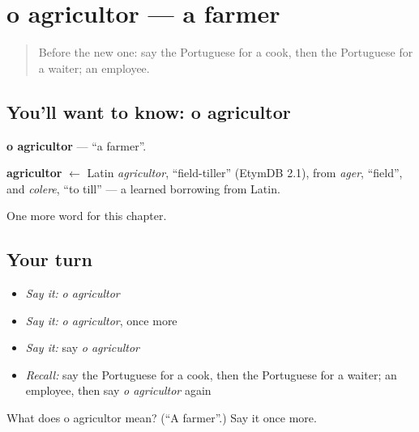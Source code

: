 \section[o agricultor]{o agricultor — a farmer}

\label{lesson:PT-C110-agricultor}



\begin{quote}
Before the new one: say the Portuguese for a cook, then the Portuguese for a waiter; an employee.
\end{quote}

\subsection*{You'll want to know: o agricultor}
\textbf{o agricultor} — \textquotedblleft{}a farmer\textquotedblright{}.

\begin{cousinweb}
\textbf{agricultor} $\leftarrow$ Latin \emph{agricultor}, \textquotedblleft{}field-tiller\textquotedblright{} (EtymDB 2.1), from \emph{ager}, \textquotedblleft{}field\textquotedblright{}, and \emph{colere}, \textquotedblleft{}to till\textquotedblright{} — a learned borrowing from Latin.
\end{cousinweb}

\begin{grammarlens}[title={What you've built}]
One more word for this chapter.
\end{grammarlens}

\subsection*{Your turn}
\begin{itemize}
\raggedright
  \item \emph{Say it:} \emph{o agricultor}
  \item \emph{Say it:} \emph{o agricultor}, once more
  \item \emph{Say it:} say \emph{o agricultor}
  \item \emph{Recall:} say the Portuguese for a cook, then the Portuguese for a waiter; an employee, then say \emph{o agricultor} again
\end{itemize}

\begin{tcolorbox}[breakable,colback=teal!4,colframe=teal!35!black,title={Before you move on}]
What does o agricultor mean? (\textquotedblleft{}A farmer\textquotedblright{}.) Say it once more.
\end{tcolorbox}
